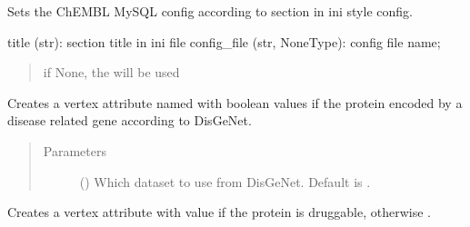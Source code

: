 \documentclass[letterpaper,10pt,english]{sphinxmanual}
\begin{document}
\begin{fulllineitems}
\begin{fulllineitems}
\end{fulllineitems}


\begin{fulllineitems}
\label{\detokenize{main:pypath.main.PyPath.set_chembl_mysql}}
Sets the ChEMBL MySQL config according to
 section in  ini style config.

title (str): section title in ini file
config\_file (str, NoneType): config file name;
\begin{quote}

if None, the 
will be used
\end{quote}

\end{fulllineitems}


\begin{fulllineitems}
\label{\detokenize{main:pypath.main.PyPath.set_disease_genes}}
Creates a vertex attribute named  with boolean values 
if the protein encoded by a disease related gene according to
DisGeNet.
\begin{quote}\begin{description}
\item[{Parameters}] \leavevmode
{} () \textendash{} Which dataset to use from DisGeNet. Default is .

\end{description}\end{quote}

\end{fulllineitems}


\begin{fulllineitems}
\label{\detokenize{main:pypath.main.PyPath.set_druggability}}
Creates a vertex attribute  with value  if
the protein is druggable, otherwise .


\end{fulllineitems}
\end{fulllineitems}
\end{document}
